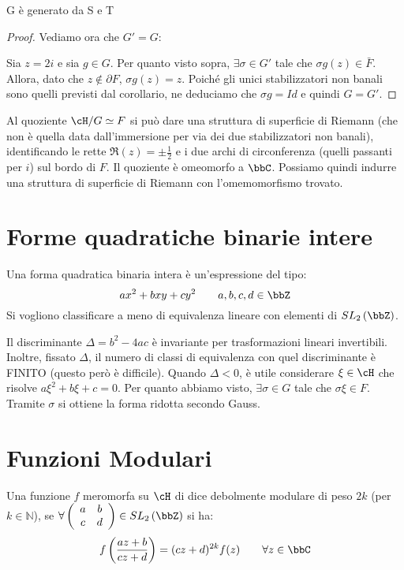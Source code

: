 \begin{teorema}
G è generato da S e T
\end{teorema}


\begin{proof}
Vediamo ora che $G'=G$:

Sia $z=2i$ e sia $g \in G$. Per quanto visto sopra, $\exists \sigma \in G'$
tale che $\sigma g(z) \in \bar{F}$. Allora, dato che $z \notin \partial F$,
$\sigma g(z)=z$.
Poiché gli unici stabilizzatori non banali sono quelli
previsti dal corollario, ne deduciamo che $\sigma g = Id$ e quindi $G=G'$.
\end{proof}

\begin{osservazione}
  Al quoziente $\cH/G \simeq F$ si può dare una struttura di superficie di Riemann
  (che non è quella data dall'immersione per via dei due stabilizzatori non banali),
  identificando le rette $\Re(z)=\pm \frac{1}{2}$ e i due archi di circonferenza
  (quelli passanti per $i$) sul bordo di $F$. Il quoziente è omeomorfo a $\bbC$.
  Possiamo quindi indurre una struttura di superficie di Riemann con l'omemomorfismo trovato.
\end{osservazione}

\section{Forme quadratiche binarie intere}
Una forma quadratica binaria intera è un'espressione del tipo:
$$ ax^2+bxy+cy^2 \qquad a,b,c,d \in \bbZ $$
Si vogliono classificare a meno di equivalenza lineare con elementi di
$SL_2 \left( \bbZ \right)$.

\begin{osservazione}
Il discriminante $\Delta =b^2-4ac$ è invariante per trasformazioni lineari
invertibili. Inoltre, fissato $\Delta$, il numero di classi di equivalenza con
quel discriminante è FINITO (questo però è difficile).
Quando $\Delta < 0$, è utile considerare $\xi \in \cH$ che risolve
$a \xi^2 + b \xi + c =0$. Per quanto abbiamo visto, $\exists \sigma \in G$
tale che $\sigma \xi \in F$. Tramite $\sigma$ si ottiene la forma ridotta secondo
Gauss.
\end{osservazione}

\section{Funzioni Modulari}
\begin{definizione}
Una funzione $f$ meromorfa su $\cH$ di dice debolmente modulare di peso $2k$ (per $k \in \mathbb{N}$), se $\forall
\left( \begin{array}{cc} a & b \\ c & d \end{array} \right) \in
SL_2 \left( \bbZ \right)$ si ha:
$$ f\left( \frac{az+b}{cz+d} \right) = (cz+d)^{2k} f(z)
\qquad \forall z \in \bbC$$
\end{definizione}

